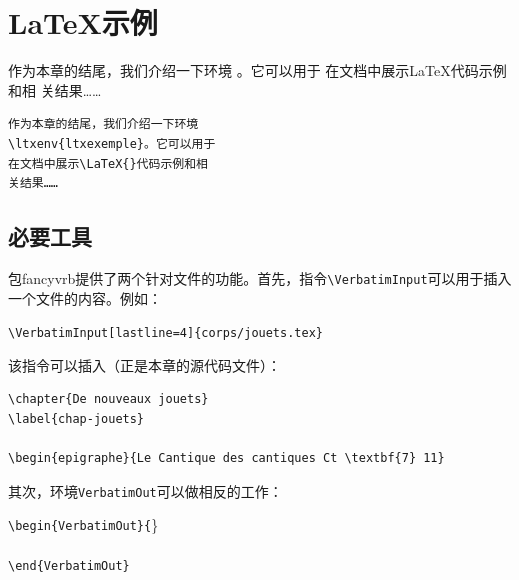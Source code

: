 \fancyhead[LE]{\ongletpaire\bfseries\thepage}
\fancyhead[RO]{\bfseries\thepage\ongletimpaire}

\section{\LaTeX 示例}

\begin{codelist}[11.31]{
    作为本章的结尾，我们介绍一下环境
    。它可以用于
    在文档中展示\LaTeX 代码示例和相
    关结果……
}
\begin{verbatim}
作为本章的结尾，我们介绍一下环境
\ltxenv{ltxexemple}。它可以用于
在文档中展示\LaTeX{}代码示例和相
关结果……\end{verbatim}
\end{codelist}

\subsection{必要工具}

包\textsf{fancyvrb}提供了两个针对文件的功能。首先，指令\verb|\VerbatimInput|可以用于插入一个文件的内容。例如：

\begin{dmd}
\verb|\VerbatimInput[lastline=4]{corps/jouets.tex}|
\end{dmd}

该指令可以插入（正是本章的源代码文件）：

\begin{dmd}
\begin{verbatim}
\chapter{De nouveaux jouets}
\label{chap-jouets}

\begin{epigraphe}{Le Cantique des cantiques Ct \textbf{7} 11}\end{verbatim}
\end{dmd}

其次，环境\verb|VerbatimOut|可以做相反的工作：

\begin{dmd}
\verb|\begin{VerbatimOut}{|\}\\
\verb|    |\\
\verb|\end{VerbatimOut}|
\end{dmd}

